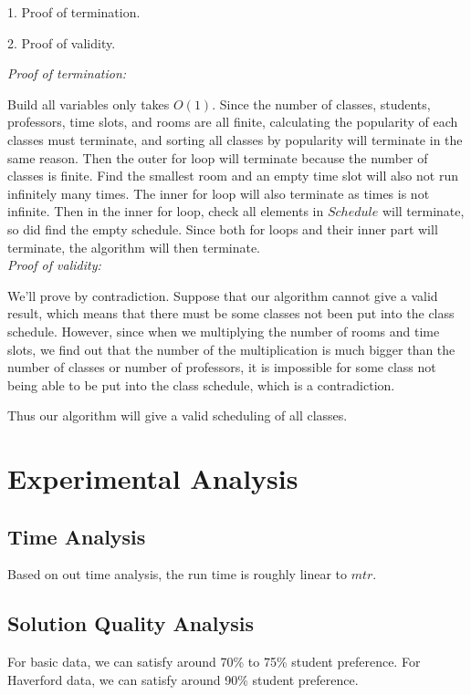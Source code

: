\documentclass[11pt, oneside]{article}   	%
\begin{document}
1. Proof of termination.

2. Proof of validity.

\textit{Proof of termination:}

Build all variables only takes $O(1)$. Since the number of classes, students, professors, time slots, and rooms are all finite, calculating the popularity of each classes must terminate, and sorting all classes by popularity will terminate in the same reason. Then the outer for loop will terminate because the number of classes is finite. Find the smallest room and an empty time slot will also not run infinitely many times. The inner for loop will also terminate as times is not infinite. Then in the inner for loop, check all elements in $Schedule$ will terminate, so did find the empty schedule. Since both for loops and their inner part will terminate, the algorithm will then terminate. \\

\textit{Proof of validity:}

We'll prove by contradiction. Suppose that our algorithm cannot give a valid result, which means that there must be some classes not been put into the class schedule. However, since when we multiplying the number of rooms and time slots, we find out that the number of the multiplication is much bigger than the number of classes or number of professors, it is impossible for some class not being able to be put into the class schedule, which is a contradiction.

Thus our algorithm will give a valid scheduling of all classes.


\newpage
\section{Experimental Analysis}
\subsection{Time Analysis}
Based on out time analysis, the run time is roughly linear to $mtr$.

\subsection{Solution Quality Analysis}
For basic data, we can satisfy around 70\% to 75\% student preference. For Haverford data, we can satisfy around 90\% student preference. %


\end{document}
